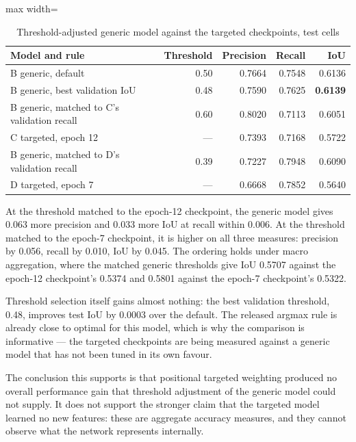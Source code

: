 \begin{table}[htbp]
\centering
\caption{Threshold-adjusted generic model against the targeted checkpoints, test cells}\label{tab:C.5}
\begin{adjustbox}{max width=\textwidth}
\begin{tabular}{@{}lrrrr@{}}
\toprule
Model and rule & Threshold & Precision & Recall & IoU \\
\midrule
B generic, default & 0.50 & 0.7664 & 0.7548 & 0.6136 \\
B generic, best validation IoU & 0.48 & 0.7590 & 0.7625 & \textbf{0.6139} \\
B generic, matched to C's validation recall & 0.60 & 0.8020 & 0.7113 & 0.6051 \\
C targeted, epoch 12 & --- & 0.7393 & 0.7168 & 0.5722 \\
B generic, matched to D's validation recall & 0.39 & 0.7227 & 0.7948 & 0.6090 \\
D targeted, epoch 7 & --- & 0.6668 & 0.7852 & 0.5640 \\
\bottomrule
\end{tabular}
\end{adjustbox}
\end{table}
\restoreparskip

At the threshold matched to the epoch-12 checkpoint, the generic model gives 0.063 more precision and 0.033 more IoU at recall within 0.006. At the threshold matched to the epoch-7 checkpoint, it is higher on all three measures: precision by 0.056, recall by 0.010, IoU by 0.045. The ordering holds under macro aggregation, where the matched generic thresholds give IoU 0.5707 against the epoch-12 checkpoint's 0.5374 and 0.5801 against the epoch-7 checkpoint's 0.5322.

Threshold selection itself gains almost nothing: the best validation threshold, 0.48, improves test IoU by 0.0003 over the default. The released argmax rule is already close to optimal for this model, which is why the comparison is informative --- the targeted checkpoints are being measured against a generic model that has not been tuned in its own favour.

The conclusion this supports is that positional targeted weighting produced no overall performance gain that threshold adjustment of the generic model could not supply. It does not support the stronger claim that the targeted model learned no new features: these are aggregate accuracy measures, and they cannot observe what the network represents internally.

